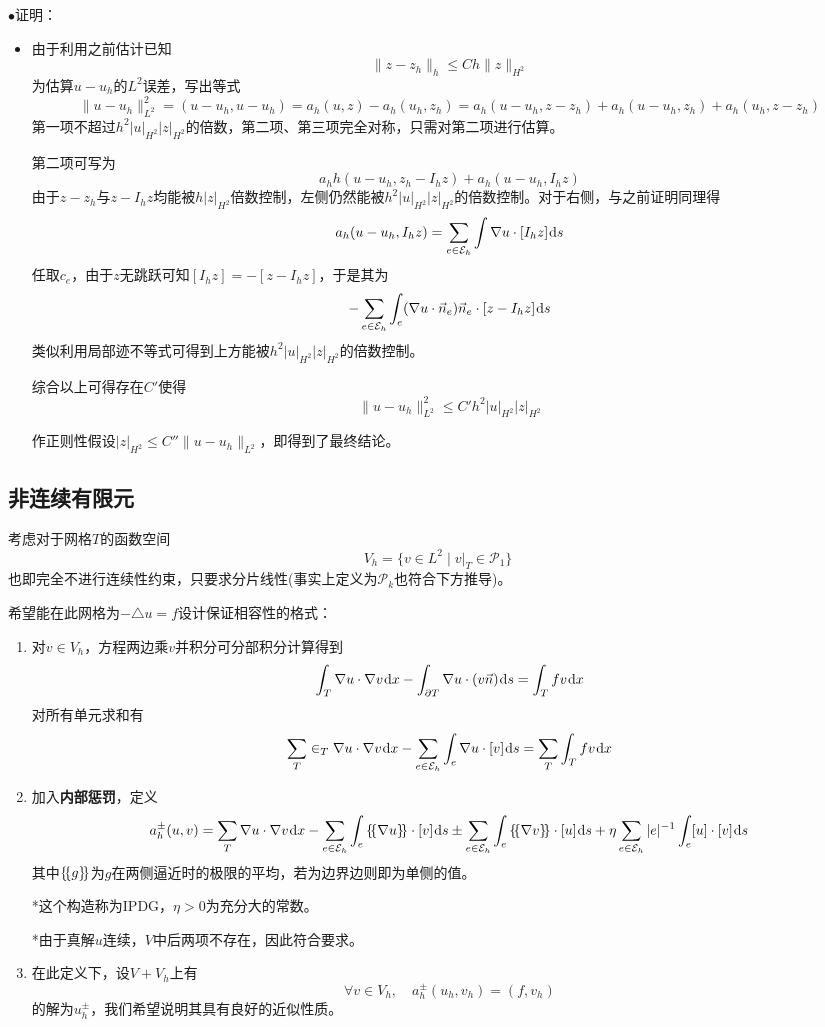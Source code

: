 \documentclass[a4paper,UTF8,fontset=windows]{ctexart}
\newcommand*{\dr}{\hspace{0.07em}\mathrm{d}}
\newcommand*{\ce}{\mathcal{E}}
\newcommand*{\cp}{\mathcal{P}}
\newcommand{\proo}[1]{{\kaishu $\bullet$证明：
\begin{itemize}
    \item[] #1
\end{itemize}
}}
\newcommand*{\ave}[1]{\left\{\hspace{-0.2em}\left\{#1\right\}\hspace{-0.2em}\right\}}
\begin{document}
\proo{
    由于利用之前估计已知
    $$\|z-z_h\|_h\le Ch\|z\|_{H^2}$$
    为估算$u-u_h$的$L^2$误差，写出等式
    $$\|u-u_h\|_{L^2}^2=(u-u_h,u-u_h)=a_h(u,z)-a_h(u_h,z_h)=a_h(u-u_h,z-z_h)+a_h(u-u_h,z_h)+a_h(u_h,z-z_h)$$
    第一项不超过$h^2|u|_{H^2}|z|_{H^2}$的倍数，第二项、第三项完全对称，只需对第二项进行估算。

    第二项可写为
    $$a_hh(u-u_h,z_h-I_hz)+a_h(u-u_h,I_hz)$$
    由于$z-z_h$与$z-I_hz$均能被$h|z|_{H^2}$倍数控制，左侧仍然能被$h^2|u|_{H^2}|z|_{H^2}$的倍数控制。对于右侧，与之前证明同理得
    $$a_h(u-u_h,I_hz)=\sum_{e\in\ce_h}\int\nabla u\cdot[I_hz]\dr s$$
    任取$c_e$，由于$z$无跳跃可知$[I_hz]=-[z-I_hz]$，于是其为
    $$-\sum_{e\in\ce_h}\int_e(\nabla u\cdot\vec{n}_e)\vec{n}_e\cdot[z-I_hz]\dr s$$
    类似利用局部迹不等式可得到上方能被$h^2|u|_{H^2}|z|_{H^2}$的倍数控制。

    综合以上可得存在$C'$使得
    $$\|u-u_h\|_{L^2}^2\le C'h^2|u|_{H^2}|z|_{H^2}$$

    作正则性假设$|z|_{H^2}\le C''\|u-u_h\|_{L^2}$，即得到了最终结论。
}

\subsection{非连续有限元}
考虑对于网格$T$的函数空间
$$V_h=\{v\in L^2\mid v|_T\in\cp_1\}$$
也即完全不进行连续性约束，只要求分片线性(事实上定义为$\cp_k$也符合下方推导)。

希望能在此网格为$-\triangle u=f$设计保证相容性的格式：
\begin{enumerate}
    \item 对$v\in V_h$，方程两边乘$v$并积分可分部积分计算得到
    $$\int_T\nabla u\cdot\nabla v\dr x-\int_{\partial T}\nabla u\cdot(v\vec{n})\dr s=\int_Tfv\dr x$$
    对所有单元求和有
    $$\sum_T\in_T\nabla u\cdot\nabla v\dr x-\sum_{e\in\ce_h}\int_e\nabla u\cdot[v]\dr s=\sum_T\int_Tfv\dr x$$
    \item 加入\textbf{内部惩罚}，定义
    $$a_h^\pm(u,v)=\sum_T\nabla u\cdot\nabla v\dr x-\sum_{e\in\ce_h}\int_e\ave{\nabla u}\cdot[v]\dr s\pm\sum_{e\in\ce_h}\int_e\ave{\nabla v}\cdot[u]\dr s+\eta\sum_{e\in\ce_h}|e|^{-1}\int_e[u]\cdot[v]\dr s$$
    其中$\ave{g}$为$g$在两侧逼近时的极限的平均，若为边界边则即为单侧的值。

    *这个构造称为IPDG，$\eta>0$为充分大的常数。

    *由于真解$u$连续，$V$中后两项不存在，因此符合要求。

    \item 在此定义下，设$V+V_h$上有
    $$\forall v\in V_h,\quad a_h^\pm(u_h,v_h)=(f,v_h)$$
    的解为$u_h^\pm$，我们希望说明其具有良好的近似性质。
\end{enumerate}
\end{document}
